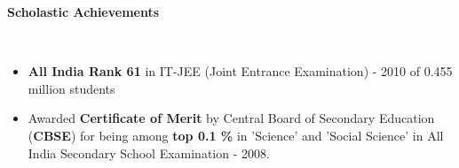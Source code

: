 \documentclass[a4paper,11pt]{article}
\newcommand{\lsep}{-0.5cm}
\newcommand{\resheading}[1]{{\small \colorbox{mygrey}{\begin{minipage}{0.975\textwidth}{\textbf{#1 \vphantom{p\^{E}}}}\end{minipage}}}}
\begin{document}
\resheading{\textbf{\large Scholastic Achievements}}\\[\lsep]
\begin{itemize}
  \item \textbf{All India Rank 61} in IT-JEE (Joint Entrance Examination) - 2010 of 0.455 million students\\[-0.7cm]


  \item Awarded \textbf{Certificate of Merit} by Central Board of Secondary Education (\textbf{CBSE}) for being among \textbf{top 0.1 \%} in 'Science' and 'Social Science' in All India Secondary School Examination - 2008. \\[-0.7cm]


\end{itemize}
\end{document}

